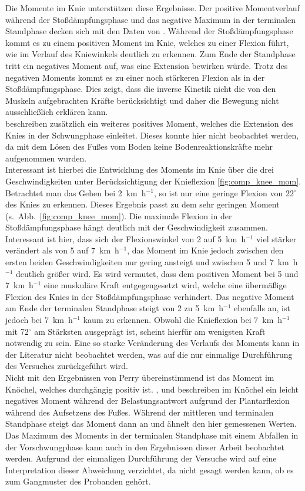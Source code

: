 Die Momente im Knie unterstützen diese Ergebnisse. Der positive Momentverlauf während der Stoßdämpfungsphase und das negative Maximum in der terminalen Standphase decken sich mit den Daten von \textcite{perry2010gait}. Während der Stoßdämpfungsphase kommt es zu einem positiven Moment im Knie, welches zu einer Flexion führt, wie im Verlauf des Kniewinkels deutlich zu erkennen. Zum Ende der Standphase tritt ein negatives Moment auf, was eine Extension bewirken würde. Trotz des negativen Moments kommt es zu einer noch stärkeren Flexion als in der Stoßdämpfungsphase. Dies zeigt, dass die inverse Kinetik nicht die von den Muskeln aufgebrachten Kräfte berücksichtigt und daher die Bewegung nicht ausschließlich erklären kann.\\
\textcite{perry2010gait} beschreiben zusätzlich ein weiteres positives Moment, welches die Extension des Knies in der Schwungphase einleitet. Dieses konnte hier nicht beobachtet werden, da mit dem Lösen des Fußes vom Boden keine Bodenreaktionskräfte mehr aufgenommen wurden.\\
Interessant ist hierbei die Entwicklung des Moments im Knie über die drei Geschwindigkeiten unter Berücksichtigung der Knieflexion \ref{fig:comp_knee_mom}. Betrachtet man das Gehen bei 2~km~h$^{-1}$, so ist nur eine geringe Flexion von 22$^{\circ}$ des Knies zu erkennen. Dieses Ergebnis passt zu dem sehr geringen Moment (s.~Abb.~\ref{fig:comp_knee_mom}). Die maximale Flexion in der Stoßdämpfungsphase hängt deutlich mit der Geschwindigkeit zusammen. Interessant ist hier, dass sich der Flexionswinkel von 2 auf 5~km~h$^{-1}$  viel stärker verändert als von 5 auf 7~km~h$^{-1}$, das Moment im Knie jedoch zwischen den ersten beiden Geschwindigkeiten nur gering ansteigt und zwischen 5 und 7~km~h$^{-1}$ deutlich größer wird. Es wird vermutet, dass dem positiven Moment bei 5 und 7~km~h$^{-1}$ eine muskuläre Kraft entgegengesetzt wird, welche eine übermäßige Flexion des Knies in der Stoßdämpfungsphase verhindert. Das negative Moment am Ende der terminalen Standphase steigt von 2 zu 5~km~h$^{-1}$ ebenfalls an, ist jedoch bei 7~km~h$^{-1}$ kaum zu erkennen. Obwohl die Knieflexion bei 7~km~h$^{-1}$ mit 72$^{\circ}$ am Stärksten ausgeprägt ist, scheint hierfür am wenigsten Kraft notwendig zu sein. Eine so starke Veränderung des Verlaufs des Moments kann in der Literatur nicht beobachtet werden, was auf die nur einmalige Durchführung des Versuches zurückgeführt wird.\\
Nicht mit den Ergebnissen von Perry übereinstimmend ist das Moment im Knöchel, welches durchgängig positiv ist. \textcite{perry2010gait}, \textcite{eng1995kinetic} und \textcite{lay2006effects} beschreiben im Knöchel ein leicht negatives Moment während der Belastungsantwort aufgrund der Plantarflexion während des Aufsetzens des Fußes. Während der mittleren und terminalen Standphase steigt das Moment dann an und ähnelt den hier gemessenen Werten. Das Maximum des Moments in der terminalen Standphase mit einem Abfallen in der Vorschwungphase kann auch in den Ergebnissen dieser Arbeit beobachtet werden. Aufgrund der einmaligen Durchführung der Versuche wird auf eine Interpretation dieser Abweichung verzichtet, da nicht gesagt werden kann, ob es zum Gangmuster des Probanden gehört.\\
